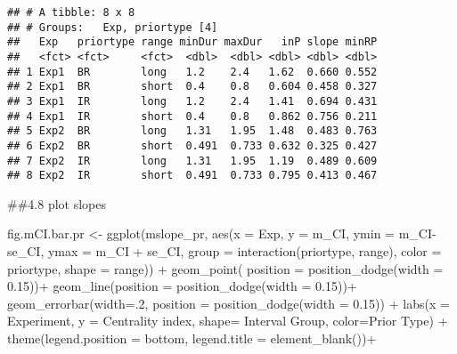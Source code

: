\documentclass[
]{article}
\newenvironment{Shaded}{\begin{snugshade}}{\end{snugshade}}
\newcommand{\AttributeTok}[1]{\textcolor[rgb]{0.77,0.63,0.00}{#1}}
\newcommand{\DecValTok}[1]{\textcolor[rgb]{0.00,0.00,0.81}{#1}}
\newcommand{\FloatTok}[1]{\textcolor[rgb]{0.00,0.00,0.81}{#1}}
\newcommand{\FunctionTok}[1]{\textcolor[rgb]{0.00,0.00,0.00}{#1}}
\newcommand{\NormalTok}[1]{#1}
\newcommand{\OtherTok}[1]{\textcolor[rgb]{0.56,0.35,0.01}{#1}}
\newcommand{\SpecialCharTok}[1]{\textcolor[rgb]{0.00,0.00,0.00}{#1}}
\newcommand{\StringTok}[1]{\textcolor[rgb]{0.31,0.60,0.02}{#1}}
\begin{document}
\begin{verbatim}
## # A tibble: 8 x 8
## # Groups:   Exp, priortype [4]
##   Exp   priortype range minDur maxDur   inP slope minRP
##   <fct> <fct>     <fct>  <dbl>  <dbl> <dbl> <dbl> <dbl>
## 1 Exp1  BR        long   1.2    2.4   1.62  0.660 0.552
## 2 Exp1  BR        short  0.4    0.8   0.604 0.458 0.327
## 3 Exp1  IR        long   1.2    2.4   1.41  0.694 0.431
## 4 Exp1  IR        short  0.4    0.8   0.862 0.756 0.211
## 5 Exp2  BR        long   1.31   1.95  1.48  0.483 0.763
## 6 Exp2  BR        short  0.491  0.733 0.632 0.325 0.427
## 7 Exp2  IR        long   1.31   1.95  1.19  0.489 0.609
## 8 Exp2  IR        short  0.491  0.733 0.795 0.413 0.467
\end{verbatim}

\#\#4.8 plot slopes

\begin{Shaded}
\begin{Highlighting}[]
\NormalTok{fig.mCI.bar.pr }\OtherTok{\textless{}{-}} \FunctionTok{ggplot}\NormalTok{(mslope\_pr, }\FunctionTok{aes}\NormalTok{(}\AttributeTok{x =}\NormalTok{ Exp, }\AttributeTok{y =}\NormalTok{ m\_CI, }\AttributeTok{ymin =}\NormalTok{ m\_CI}\SpecialCharTok{{-}}\NormalTok{ se\_CI, }\AttributeTok{ymax =}\NormalTok{ m\_CI }\SpecialCharTok{+}\NormalTok{ se\_CI, }\AttributeTok{group =} \FunctionTok{interaction}\NormalTok{(priortype, range), }\AttributeTok{color =}\NormalTok{ priortype, }\AttributeTok{shape =}\NormalTok{ range)) }\SpecialCharTok{+} 
  \FunctionTok{geom\_point}\NormalTok{( }\AttributeTok{position =} \FunctionTok{position\_dodge}\NormalTok{(}\AttributeTok{width =} \FloatTok{0.15}\NormalTok{))}\SpecialCharTok{+}
  \FunctionTok{geom\_line}\NormalTok{(}\AttributeTok{position =} \FunctionTok{position\_dodge}\NormalTok{(}\AttributeTok{width =} \FloatTok{0.15}\NormalTok{))}\SpecialCharTok{+}
  \FunctionTok{geom\_errorbar}\NormalTok{(}\AttributeTok{width=}\NormalTok{.}\DecValTok{2}\NormalTok{,  }\AttributeTok{position =} \FunctionTok{position\_dodge}\NormalTok{(}\AttributeTok{width =} \FloatTok{0.15}\NormalTok{)) }\SpecialCharTok{+}
  \FunctionTok{labs}\NormalTok{(}\AttributeTok{x =} \StringTok{\textquotesingle{}Experiment\textquotesingle{}}\NormalTok{, }\AttributeTok{y =} \StringTok{\textquotesingle{}Centrality index\textquotesingle{}}\NormalTok{, }\AttributeTok{shape=} \StringTok{\textquotesingle{}Interval Group\textquotesingle{}}\NormalTok{, }\AttributeTok{color=}\StringTok{\textquotesingle{}Prior Type\textquotesingle{}}\NormalTok{) }\SpecialCharTok{+}
  \FunctionTok{theme}\NormalTok{(}\AttributeTok{legend.position =} \StringTok{\textquotesingle{}bottom\textquotesingle{}}\NormalTok{, }\AttributeTok{legend.title =} \FunctionTok{element\_blank}\NormalTok{())}\SpecialCharTok{+}

\end{Highlighting}
\end{Shaded}
\end{document}
